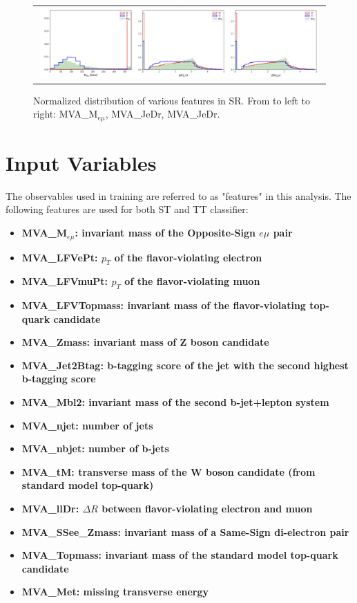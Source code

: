 \begin{figure}[tbh!]
 \begin{center}
 \begin{tabular}{c}
  \includegraphics[width=0.99\textwidth]{figures/Part3/BDT/Features1}\\
 \end{tabular}
 \caption{Normalized distribution of various features in SR. From to left to right: MVA\_M$_{e\mu}$, MVA\_JeDr, MVA\_JeDr.}
 \label{fig:Features1}
 \end{center}
\end{figure}
\section{Input Variables}
\label{sec:Input}

The observables used in training are referred to as "features" in this analysis. The following features are used for both ST and TT classifier:

\begin{itemize}
\item \textbf{MVA\_M$_{e\mu}$: invariant mass of the Opposite-Sign $e\mu$ pair}
\item \textbf{MVA\_LFVePt: $p_T$ of the flavor-violating electron}
\item \textbf{MVA\_LFVmuPt: $p_T$ of the flavor-violating muon}
\item \textbf{MVA\_LFVTopmass: invariant mass of the flavor-violating top-quark candidate}
\item \textbf{MVA\_Zmass: invariant mass of Z boson candidate}
\item \textbf{MVA\_Jet2Btag: b-tagging score of the jet with the second highest b-tagging score}
\item \textbf{MVA\_Mbl2: invariant mass of the second b-jet+lepton system}
\item \textbf{MVA\_njet: number of jets}
\item \textbf{MVA\_nbjet: number of b-jets}
\item \textbf{MVA\_tM: transverse mass of the W boson candidate (from standard model top-quark)}
\item \textbf{MVA\_llDr: $\Delta R$ between flavor-violating electron and muon}
\item \textbf{MVA\_SSee\_Zmass: invariant mass of a Same-Sign di-electron pair}
\item \textbf{MVA\_Topmass: invariant mass of the standard model top-quark candidate}
\item \textbf{MVA\_Met: missing transverse energy}
\end{itemize}

